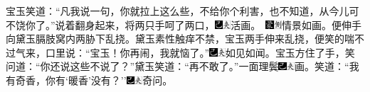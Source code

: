 宝玉笑道：``凡我说一句，你就拉上这么些，不给你个利害，也不知道，从今儿可不饶你了。''说着翻身起来，将两只手呵了两口，{\includegraphics[width=3mm]{../Images/00003}\includegraphics[width=3mm]{../Images/00012}\footnotesize \kaishu 活画。　\includegraphics[width=3mm]{../Images/00006}\includegraphics[width=3mm]{../Images/00011}\footnotesize \kaishu 情景如画。}便伸手向黛玉膈肢窝内两胁下乱挠。黛玉素性触痒不禁，宝玉两手伸来乱挠，便笑的喘不过气来，口里说：``宝玉！你再闹，我就恼了。''{\includegraphics[width=3mm]{../Images/00003}\includegraphics[width=3mm]{../Images/00012}\footnotesize \kaishu 如见如闻。}宝玉方住了手，笑问道：``你还说这些不说了？''黛玉笑道：``再不敢了。''一面理鬓{\includegraphics[width=3mm]{../Images/00003}\includegraphics[width=3mm]{../Images/00012}\footnotesize \kaishu 画。}笑道：``我有奇香，你有`暖香'没有？''{\includegraphics[width=3mm]{../Images/00003}\includegraphics[width=3mm]{../Images/00012}\footnotesize \kaishu 奇问。}

